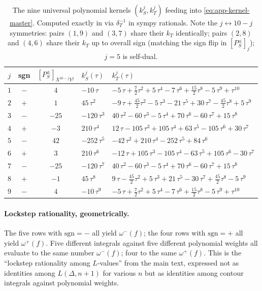 \documentclass[11pt,letterpaper]{article}
\begin{document}
\begin{table}[h]\centering
\renewcommand{\arraystretch}{1.25}
\begin{tabular}{cccll}
\toprule
$j$ & sgn & $[P^\pm_S]_{X^{10-j}Y^j}$ & $k_S^{j}(\tau)$ & $k_T^{j}(\tau)$ \\
\midrule
$1$ & $-$ & $4$    & $-10\,\tau$        & $-5\,\tau + \tfrac{7}{2}\tau^{2} + 5\,\tau^{4} - 7\,\tau^{6} + \tfrac{15}{2}\tau^{8} - 5\,\tau^{9} + \tau^{10}$ \\
$2$ & $+$ & $1$    & $45\,\tau^{2}$     & $-9\,\tau + \tfrac{45}{2}\tau^{2} - 5\,\tau^{3} - 21\,\tau^{5} + 30\,\tau^{7} - \tfrac{45}{2}\tau^{8} + 5\,\tau^{9}$ \\
$3$ & $-$ & $-25$  & $-120\,\tau^{3}$   & $40\,\tau^{2} - 60\,\tau^{3} - 5\,\tau^{4} + 70\,\tau^{6} - 60\,\tau^{7} + 15\,\tau^{8}$ \\
$4$ & $+$ & $-3$   & $210\,\tau^{4}$    & $12\,\tau - 105\,\tau^{3} + 105\,\tau^{4} + 63\,\tau^{5} - 105\,\tau^{6} + 30\,\tau^{7}$ \\
$5$ & $-$ & $42$   & $-252\,\tau^{5}$   & $-42\,\tau^{2} + 210\,\tau^{4} - 252\,\tau^{5} + 84\,\tau^{6}$ \\
$6$ & $+$ & $3$    & $210\,\tau^{6}$    & $-12\,\tau + 105\,\tau^{3} - 105\,\tau^{4} - 63\,\tau^{5} + 105\,\tau^{6} - 30\,\tau^{7}$ \\
$7$ & $-$ & $-25$  & $-120\,\tau^{7}$   & $40\,\tau^{2} - 60\,\tau^{3} - 5\,\tau^{4} + 70\,\tau^{6} - 60\,\tau^{7} + 15\,\tau^{8}$ \\
$8$ & $+$ & $-1$   & $45\,\tau^{8}$     & $9\,\tau - \tfrac{45}{2}\tau^{2} + 5\,\tau^{3} + 21\,\tau^{5} - 30\,\tau^{7} + \tfrac{45}{2}\tau^{8} - 5\,\tau^{9}$ \\
$9$ & $-$ & $4$    & $-10\,\tau^{9}$    & $-5\,\tau + \tfrac{7}{2}\tau^{2} + 5\,\tau^{4} - 7\,\tau^{6} + \tfrac{15}{2}\tau^{8} - 5\,\tau^{9} + \tau^{10}$ \\
\bottomrule
\end{tabular}
\caption{The nine universal polynomial kernels $(k_S^j, k_T^j)$ feeding into
\eqref{eq:app-kernel-master}.  Computed exactly in
\cite{KernelScript} via $\delta_T^{-1}$ in sympy rationals.
Note the $j \leftrightarrow 10-j$ symmetries: pairs $(1,9)$ and $(3,7)$
share their $k_T$ identically; pairs $(2,8)$ and $(4,6)$ share their
$k_T$ up to overall sign (matching the sign flip in $[P^\pm_S]_j$);
$j=5$ is self-dual.}\label{tab:kernels}
\end{table}

\paragraph{Lockstep rationality, geometrically.}
The five rows with $\text{sgn} = -$ all yield $\omega^-(f)$; the four rows
with $\text{sgn} = +$ all yield $\omega^+(f)$.  Five different integrals
against five different polynomial weights all evaluate to the same number
$\omega^-(f)$; four to the same $\omega^+(f)$.  This is the
``lockstep rationality among $L$-values'' from the main text, expressed
not as identities among $L(\Delta, n+1)$ for various $n$ but as identities
among contour integrals against polynomial weights.
\end{document}
